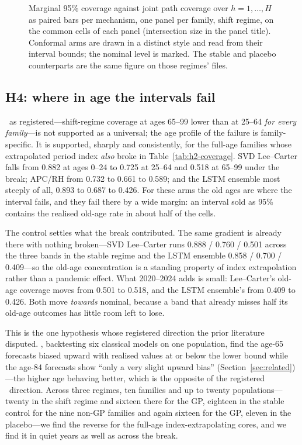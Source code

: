 \begin{figure}[htbp]\centering
{}
\caption{Marginal 95\% coverage against joint path coverage over
$h=1,\dots,H$ as paired bars per mechanism, one panel per family, shift
regime, on the common cells of each panel (intersection size in the panel
title). Conformal arms are drawn in a distinct style and read from their
interval bounds; the nominal level is marked. The stable and placebo
counterparts are the same figure on those regimes' files.}
\label{fig:joint-vs-marginal}
\end{figure}

\subsection{H4: where in age the intervals fail}
\label{sec:results-age}


\Hfour\ as registered---shift-regime coverage at ages 65--99 lower than at
25--64 \emph{for every family}---is not supported as a universal; the age
profile of the failure is family-specific. It is supported, sharply and
consistently, for the full-age families whose extrapolated period index
\emph{also} broke in Table~\ref{tab:h2-coverage}. SVD Lee--Carter falls
from 0.882 at ages 0--24 to 0.725 at 25--64 and 0.518 at 65--99 under the
break; APC/RH from 0.732 to 0.661 to 0.589; and the LSTM ensemble most
steeply of all, 0.893 to 0.687 to 0.426. For these arms the old ages are
where the interval fails, and they fail there by a wide margin: an
interval sold as 95\% contains the realised old-age rate in about half of
the cells.

The control settles what the break contributed. The same gradient is
already there with nothing broken---SVD Lee--Carter runs 0.888 / 0.760 /
0.501 across the three bands in the stable regime and the LSTM ensemble
0.858 / 0.700 / 0.409---so the old-age concentration is a standing
property of index extrapolation rather than a pandemic effect. What
2020--2024 adds is small: Lee--Carter's old-age coverage moves from 0.501
to 0.518, and the LSTM ensemble's from 0.409 to 0.426. Both move
\emph{towards} nominal, because a band that already misses half its old-age
outcomes has little room left to lose.

This is the one hypothesis whose registered direction the prior literature
disputed. \citet{dowd2010backtesting}, backtesting six classical models on
one population, find the age-65 forecasts biased upward with realised
values at or below the lower bound while the age-84 forecasts show ``only
a very slight upward bias'' (Section~\ref{sec:related})---the higher age
behaving better, which is the opposite of the registered \Hfour\ direction.
Across three regimes, ten families and up to twenty populations---twenty in
the shift regime and sixteen there for the GP, eighteen in the stable
control for the nine non-GP families and again sixteen for the GP, eleven
in the placebo---we find the reverse for the full-age index-extrapolating
cores, and we find it in quiet years as well as across the break.

